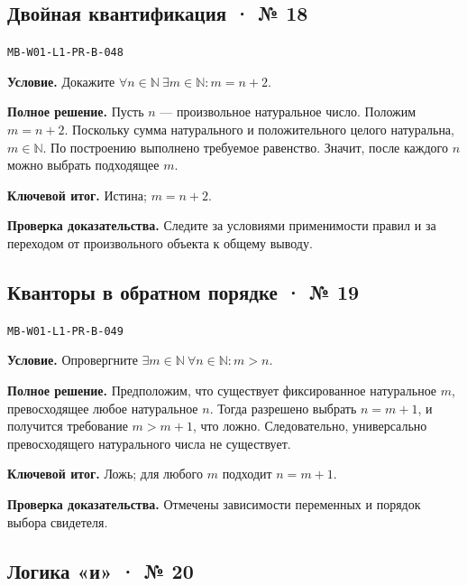 \documentclass[11pt,a4paper,openany]{book}
\newcommand{\muid}[1]{\texttt{\footnotesize #1}}
\begin{document}
\subsection*{Двойная квантификация · № 18}\hypertarget{solution:MB-W01-L1-PR-B-048}{}

\muid{MB-W01-L1-PR-B-048}\par

\textbf{Условие.} Докажите $\forall n\in\mathbb N\ \exists m\in\mathbb N\colon m=n+2$.\par

\textbf{Полное решение.} Пусть $n$ — произвольное натуральное число. Положим $m=n+2$. Поскольку сумма натурального и положительного целого натуральна, $m\in\mathbb N$. По построению выполнено требуемое равенство. Значит, после каждого $n$ можно выбрать подходящее $m$.


\begin{learnbox}\textbf{Ключевой итог.} Истина; $m=n+2$.\par \textbf{Проверка доказательства.} 
Следите за условиями применимости правил и за переходом от произвольного объекта к общему выводу. 
\end{learnbox}

\subsection*{Кванторы в обратном порядке · № 19}\hypertarget{solution:MB-W01-L1-PR-B-049}{}

\muid{MB-W01-L1-PR-B-049}\par

\textbf{Условие.} Опровергните $\exists m\in\mathbb N\ \forall n\in\mathbb N\colon m>n$.\par

\textbf{Полное решение.} Предположим, что существует фиксированное натуральное $m$, превосходящее любое натуральное $n$. Тогда разрешено выбрать $n=m+1$, и получится требование $m>m+1$, что ложно. Следовательно, универсально превосходящего натурального числа не существует.


\begin{learnbox}\textbf{Ключевой итог.} Ложь; для любого $m$ подходит $n=m+1$.\par \textbf{Проверка доказательства.} 
Отмечены зависимости переменных и порядок выбора свидетеля. 
\end{learnbox}

\subsection*{Логика «и» · № 20}\hypertarget{solution:MB-W01-L1-PR-B-050}{}
\end{document}
